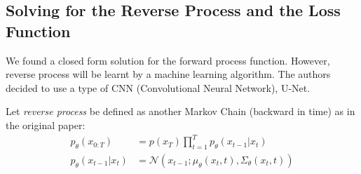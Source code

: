 \documentclass{article}
\numberwithin{equation}{subsection}
\begin{document}
\subsection{Solving for the Reverse Process and the Loss Function}


We found a closed form solution for the forward process function. However, reverse process will be learnt by a machine learning algorithm. The authors decided to use a type of CNN (Convolutional Neural Network), U-Net.

Let \textit{reverse process} be defined as another Markov Chain (backward in time) as in the original paper:
\begin{align}
    p_\theta(x_{0:T}) &= p(x_T)\prod_{t=1}^T p_\theta(x_{t-1}|x_t)\\
    p_\theta(x_{t-1}|x_t) &= \mathcal{N}(x_{t-1}; \mu_\theta(x_t, t), \Sigma_\theta(x_t,t))
\end{align}
\end{document}
